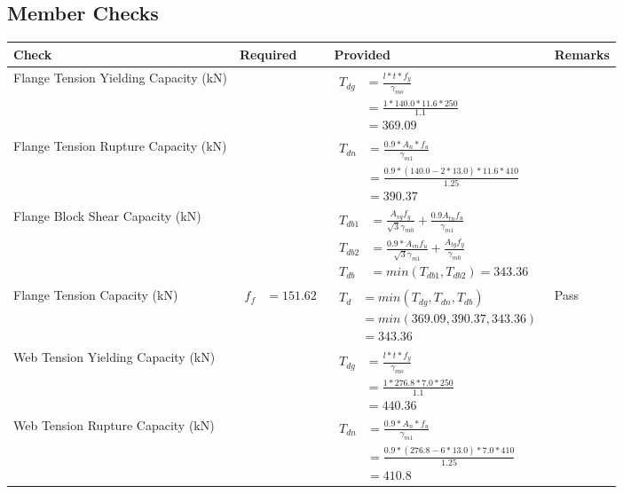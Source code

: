 \documentclass{article}%
\begin{document}
%
\newpage%
\subsection{Member Checks}%
\label{subsec:MemberChecks}%
\renewcommand{\arraystretch}{1.2}%
\begin{longtable}{|p{4cm}|p{6cm}|p{5.5cm}|p{1.5cm}|}%
\hline%
\rowcolor{OsdagGreen}%
Check&Required&Provided&Remarks\\%
\hline%
\endhead%
\hline%
Flange Tension Yielding Capacity (kN)&&$\begin{aligned} T_{dg} &= \frac{l*t*f_y}{\gamma_{mo}}\\ &=\frac{1*140.0*11.6*250}{1.1}\\ &=369.09\end{aligned}$&\\%
\hline%
Flange Tension Rupture Capacity (kN)&&$\begin{aligned} T_{dn} &= \frac{0.9*A_{n}*f_u}{\gamma_{m1}}\\ &=\frac{0.9*(140.0-2*13.0)*11.6*410}{1.25}\\ &=390.37\end{aligned}$&\\%
\hline%
Flange Block Shear Capacity (kN)&&$\begin{aligned}T_{db1} &= \frac{A_{vg} f_{y}}{\sqrt{3} \gamma_{m0}} + \frac{0.9 A_{tn} f_{u}}{\gamma_{m1}}\\ T_{db2} &= \frac{0.9*A_{vn} f_{u}}{\sqrt{3} \gamma_{m1}} + \frac{A_{tg} f_{y}}{\gamma_{m0}}\\ T_{db} &= min(T_{db1}, T_{db2})= 343.36\end{aligned}$&\\%
\hline%
Flange Tension Capacity (kN)&$\begin{aligned} f_f &=151.62\end{aligned}$&$\begin{aligned} T_d &= min(T_{dg},T_{dn},T_{db})\\ &= min(369.09,390.37,343.36)\\ &=343.36\end{aligned}$&Pass\\%
\hline%
Web Tension Yielding Capacity (kN)&&$\begin{aligned} T_{dg} &= \frac{l*t*f_y}{\gamma_{mo}}\\ &=\frac{1*276.8*7.0*250}{1.1}\\ &=440.36\end{aligned}$&\\%
\hline%
Web Tension Rupture Capacity (kN)&&$\begin{aligned} T_{dn} &= \frac{0.9*A_{n}*f_u}{\gamma_{m1}}\\ &=\frac{0.9*(276.8-6*13.0)*7.0*410}{1.25}\\ &=410.8\end{aligned}$&\\%

\end{longtable}
\end{document}
